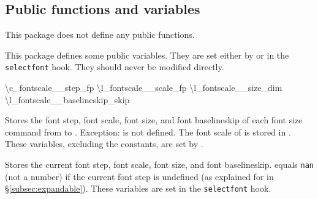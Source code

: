 \documentclass{beery}
\begin{document}
\subsection{Public functions and variables}
\label{subsec:publicexpl3}

This package does not define any public  functions.

This package defines some public  variables.
They are set either by  or in the \texttt{selectfont} hook.
They should never be modified directly.

\begin{mydisplaycode}
  \ttfamily
  \textbackslash{}c\_fontscale\_\_step\_fp
  \nopagebreak\newline
  \textbackslash{}l\_fontscale\_\_scale\_fp
  \newline
  \textbackslash{}l\_fontscale\_\_size\_dim
  \nopagebreak\newline
  \textbackslash{}l\_fontscale\_\_baselineskip\_skip
\end{mydisplaycode}

Stores the font step, font scale, font size, and font baselineskip of each font size command from  to .
Exception:
 is not defined.
The font scale of  is stored in .
These variables, excluding the constants, are set by .

\begin{mydisplaycode}
  \nopagebreak\newline
  \newline
  \nopagebreak\newline
\end{mydisplaycode}

Stores the current font step, font scale, font size, and font baselineskip.
 equals \texttt{nan} (not a number) if the current font step is undefined (as explained for  in \S\ref{subsec:expandable}).
These variables are set in the \texttt{selectfont} hook.
\end{document}
